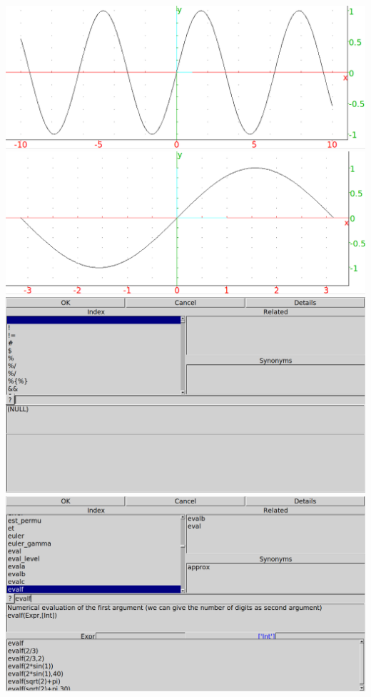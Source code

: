 \documentclass{article}
\begin{document}
\includegraphics[width=\textwidth]{xcas-sinplot.png}
\clearpage%
\includegraphics[width=\textwidth]{xcas-sinplot2.png}
\clearpage%
\includegraphics[width=\textwidth]{xcas-help-index.png}
\clearpage%
\includegraphics[width=\textwidth]{xcas-help-evalf.png}
\end{document}
